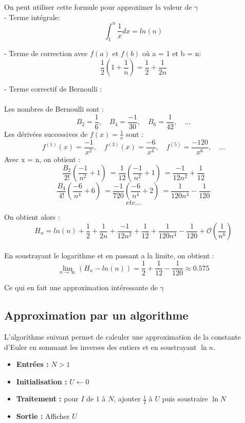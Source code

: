 \documentclass[a4paper,12pt]{article}
\begin{document}
On peut utiliser cette formule pour approximer la valeur de $\gamma$ \\

- Terme intégrale:
  \[
  \int_1^n \frac{1}{x}dx = ln(n)
  \]

- Terme de correction avec \( f(a) \) et \( f(b) \) où a = 1 et b = n:
  \[
  \frac{1}{2} \left( 1 + \frac{1}{n}\right) = \frac{1}{2} + \frac{1}{2n}
  \]

- Terme correctif de Bernoulli : \\ \\
  Les nombres de Bernoulli sont :
  \[
  B_2 = \frac{1}{6}, \quad B_4 = \frac{-1}{30}, \quad B_6 = \frac{1}{42}, \quad \dots
  \]
  Les dérivées successives de \(f(x) = \frac{1}{x}\) sont :
  \[
  f^{(1)}(x) = \frac{-1}{x^2}, \quad f^{(3)}(x) = \frac{-6}{x^4}, \quad f^{(5)} = \frac{-120}{x^6}, \quad \dots
  \]
  Avec x = n, on obtient :
  \[
   \frac{B_2}{2!}\left(\frac{-1}{n^2} + 1 \right)\ = \frac{1}{12}\left(\frac{-1}{n^2} + 1 \right)\ = \frac{-1}{12n^2} + \frac{1}{12}
  \]
  \[
   \frac{B_4}{4!}\left(\frac{-6}{n^4} + 6\right)\ = \frac{-1}{720}\left(\frac{-6}{n^4} + 2 \right)\ = \frac{1}{120n^4} - \frac{1}{120}
  \]
  \[
   etc\dots
  \]
 
On obtient alors : 
  \[
   H_n = ln(n) + \frac{1}{2} + \frac{1}{2n} + \frac{-1}{12n^2} + \frac{1}{12} + \frac{1}{120n^4} - \frac{1}{120} + \mathcal{O}(\frac{1}{n^6})
  \]
 \\
En soustrayant le logarithme et en passant a la limite, on obtient :
 \[
\lim\limits_{n \to \infty}( {H_n} - ln(n)) = \frac{1}{2} + \frac{1}{12} - \frac{1}{120} \approx 0.575
  \]

  Ce qui en fait une approximation intéressante de $\gamma$
        

        

\subsection{Approximation par un algorithme}

L'algorithme suivant permet de calculer une approximation de la constante d'Euler en sommant les inverses des entiers et en soustrayant $\ln n$.

\begin{itemize}
    \item \textbf{Entrées :} $N > 1$
    \item \textbf{Initialisation :} $U \gets 0$
    \item \textbf{Traitement :} pour $I$ de $1$ à $N$, ajouter $\frac{1}{I}$ à $U$ puis soustraire $\ln N$
    \item \textbf{Sortie :} Afficher $U$
\end{itemize}
\end{document}
